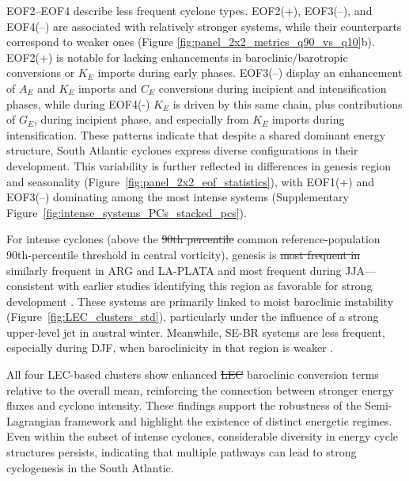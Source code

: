 \documentclass[pdflatex,sn-chicago]{sn-jnl}%
\makeatletter
\theoremstyle{plain}
\theoremstyle{definition}
\theoremstyle{remark}
\theoremstyle{definition}
\providecommand{\DIFaddtex}[1]{{\protect\color{blue}#1}} %
\providecommand{\DIFdeltex}[1]{{\protect\color{red}\sout{#1}}} %
\providecommand{\DIFaddbegin}{} %
\providecommand{\DIFaddend}{} %
\providecommand{\DIFdelbegin}{} %
\providecommand{\DIFdelend}{} %
\providecommand{\DIFadd}[1]{\texorpdfstring{\DIFaddtex{#1}}{#1}} %
\providecommand{\DIFdel}[1]{\texorpdfstring{\DIFdeltex{#1}}{}} %
\let\sout@orig\sout %
\renewcommand{\sout}[1]{\ifmmode\text{\sout@orig{\ensuremath{#1}}}\else\sout@orig{#1}\fi} %
\makeatother
\begin{document}
EOF2–EOF4 describe less frequent cyclone types. EOF2(+), EOF3(–), and EOF4(–) are associated with relatively stronger systems, while their counterparts correspond to weaker ones (Figure \ref{fig:panel_2x2_metrics_q90_vs_q10}b). EOF2(+) is notable for lacking enhancements in baroclinic/barotropic conversions or \( K_E \) imports during early phases. EOF3(–) display an enhancement of $A_E$ and $K_E$ imports and $C_E$ conversions during incipient and intensification phases, while during EOF4(-) $K_E$ is driven by this same chain, plus contributions of $G_E$, during incipient phase, and especially from $K_E$ imports during intensification. These patterns indicate that despite a shared dominant energy structure, South Atlantic cyclones express diverse configurations in their development. This variability is further reflected in differences in genesis region and seasonality (Figure~\ref{fig:panel_2x2_eof_statistics}), with EOF1(+) and EOF3(–) dominating among the most intense systems (Supplementary Figure~\ref{fig:intense_systems_PCs_stacked_pcs}).

For intense cyclones (above the \DIFdelbegin \DIFdel{90th percentile }\DIFdelend \DIFaddbegin \DIFadd{common reference-population 90th-percentile threshold }\DIFaddend in central vorticity), genesis is \DIFdelbegin \DIFdel{most frequent in }\DIFdelend \DIFaddbegin \DIFadd{similarly frequent in ARG and }\DIFaddend LA-PLATA and \DIFaddbegin \DIFadd{most frequent }\DIFaddend during JJA—consistent with earlier studies identifying this region as favorable for strong development \citep{reboita2010south,gramcianinov2019properties,crespo2021potential}. These systems are primarily linked to moist baroclinic instability (Figure~\ref{fig:LEC_clusters_std}), particularly under the influence of a strong upper-level jet in austral winter. Meanwhile, SE-BR systems are less frequent, especially during DJF, when baroclinicity in that region is weaker \citep{gramcianinov2019properties,crespo2021potential}.

All four LEC-based clusters show enhanced \DIFdelbegin \DIFdel{LEC }\DIFdelend \DIFaddbegin \DIFadd{baroclinic conversion }\DIFaddend terms relative to the overall mean, reinforcing the connection between stronger energy fluxes and cyclone intensity. These findings support the robustness of the Semi-Lagrangian framework and highlight the existence of distinct energetic regimes. Even within the subset of intense cyclones, considerable diversity in energy cycle structures persists, indicating that multiple pathways can lead to strong cyclogenesis in the South Atlantic.
\end{document}
